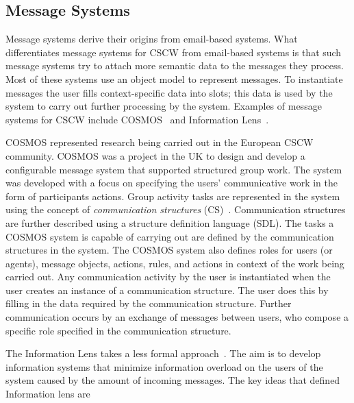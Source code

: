 \subsection{Message Systems}

Message systems derive their origins from email-based systems. What
differentiates message systems for CSCW from email-based systems is
that such message systems try to attach more semantic data to the
messages they process. Most of these systems use an object model to
represent messages. To instantiate messages the user fills
context-specific data into slots; this data is used by the system to
carry out further processing by the system.  Examples of message
systems for CSCW include COSMOS~\cite{conf/cscw/BowersC88} and
Information Lens~\cite{Malo87a}.

COSMOS represented research being carried out in the European CSCW
community. COSMOS was a project in the UK to design and develop a
configurable message system that supported structured group work. The
system was developed with a focus on specifying the users'
communicative work in the form of participants actions. Group activity
tasks are represented in the system using the concept of
\emph{communication structures}
(CS)~\cite{conf/cscw/BowersC88}. Communication structures are further
described using a structure definition language (SDL). The tasks a
COSMOS system is capable of carrying out are defined by the
communication structures in the system. The COSMOS system also
defines roles for users (or agents), message objects, actions, rules, and
actions in context of the work being carried out. Any communication
activity by the user is instantiated when the user creates an instance
of a communication structure. The user does this by filling in the
data required by the communication structure. Further communication
occurs by an exchange of messages between users, who compose a specific
role specified in the communication structure.

The Information Lens takes a less formal
approach~\cite{journals/iwc/Rodden91}. The aim is to develop
information systems that minimize information overload on the users of
the system caused by the amount of incoming messages. The key ideas
that defined Information lens are


